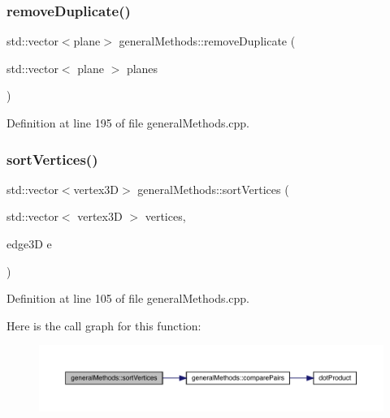 \subsubsection{\texorpdfstring{remove\+Duplicate()}{removeDuplicate()}}
{\footnotesize\ttfamily std\+::vector$<$plane$>$ general\+Methods\+::remove\+Duplicate (\begin{DoxyParamCaption}\item[{std\+::vector$<$ plane $>$}]{planes }\end{DoxyParamCaption})}



Definition at line 195 of file general\+Methods.\+cpp.

\mbox{\label{namespacegeneral_methods_a568dde4192d450d86f6563697887fbf0}} 
\subsubsection{\texorpdfstring{sort\+Vertices()}{sortVertices()}}
{\footnotesize\ttfamily std\+::vector$<$vertex3D$>$ general\+Methods\+::sort\+Vertices (\begin{DoxyParamCaption}\item[{std\+::vector$<$ vertex3D $>$}]{vertices,  }\item[{edge3D}]{e }\end{DoxyParamCaption})}



Definition at line 105 of file general\+Methods.\+cpp.

Here is the call graph for this function\+:
\nopagebreak
\begin{figure}[H]
\begin{center}
\leavevmode
\includegraphics[width=350pt]{namespacegeneral_methods_a568dde4192d450d86f6563697887fbf0_cgraph}
\end{center}
\end{figure}
